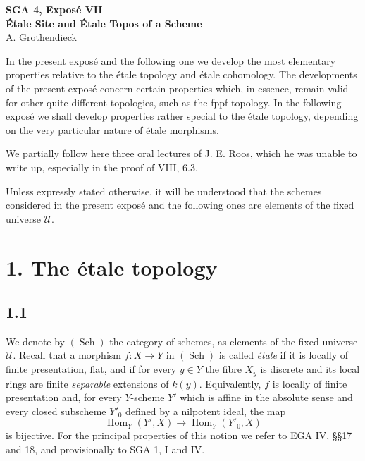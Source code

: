 \documentclass[11pt]{article}
\newcommand{\U}{\mathcal{U}}
\newcommand{\Sch}{\operatorname{Sch}}
\newcommand{\Hom}{\operatorname{Hom}}
\newcommand{\SGA}{SGA}
\newcommand{\EGA}{EGA}
\begin{document}

\begin{center}
{\Large \textbf{SGA 4, Expos\'e VII}}\\[0.35em]
{\large \textbf{\'Etale Site and \'Etale Topos of a Scheme}}\\[0.25em]
{\normalsize A. Grothendieck}
\end{center}

\bigskip

In the present expos\'e and the following one we develop the most elementary properties relative to the \'etale topology and \'etale cohomology. The developments of the present expos\'e concern certain properties which, in essence, remain valid for other quite different topologies, such as the fppf topology. In the following expos\'e we shall develop properties rather special to the \'etale topology, depending on the very particular nature of \'etale morphisms.

We partially follow here three oral lectures of J. E. Roos, which he was unable to write up, especially in the proof of VIII, 6.3.

Unless expressly stated otherwise, it will be understood that the schemes considered in the present expos\'e and the following ones are elements of the fixed universe \(\U\).

\section*{1. The \'etale topology}

\subsection*{1.1}
We denote by \((\Sch)\) the category of schemes, as elements of the fixed universe \(\U\). Recall that a morphism \(f:X\to Y\) in \((\Sch)\) is called \emph{\'etale} if it is locally of finite presentation, flat, and if for every \(y\in Y\) the fibre \(X_y\) is discrete and its local rings are finite \emph{separable} extensions of \(k(y)\). Equivalently, \(f\) is locally of finite presentation and, for every \(Y\)-scheme \(Y'\) which is affine in the absolute sense and every closed subscheme \(Y'_0\) defined by a nilpotent ideal, the map
\[
\Hom_Y(Y',X) \longrightarrow \Hom_Y(Y'_0,X)
\]
is bijective. For the principal properties of this notion we refer to \EGA{} IV, §§17 and 18, and provisionally to \SGA{} 1, I and IV.
\end{document}
